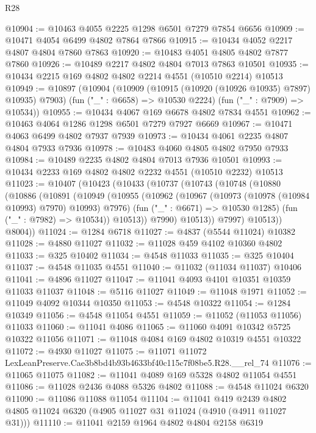 \begin{lexlean}{R28}
\begin{coremodule}
@10904 := @10463 @4055 @2225 @1298 @6501 @7279 @7854 @6656
@10909 := @10471 @4054 @6499 @4802 @7864 @7866
@10915 := @10434 @4052 @2217 @4807 @4804 @7860 @7863
@10920 := @10483 @4051 @4805 @4802 @7877 @7860
@10926 := @10489 @2217 @4802 @4804 @7013 @7863 @10501
@10935 := @10434 @2215 @169 @4802 @4802 @2214 @4551 (@10510 @2214) @10513
@10949 := @10897
    (@10904
      (@10909 (@10915 (@10920 (@10926 @10935) @7897) @10935) @7903)
      (fun ("_" : @6658) => @10530 @2224)
      (fun ("_" : @7909) => @10534))
@10955 := @10434 @4067 @169 @6678 @4802 @7834 @4551
@10962 := @10463 @4064 @1286 @1298 @6501 @7279 @7927 @6669
@10967 := @10471 @4063 @6499 @4802 @7937 @7939
@10973 := @10434 @4061 @2235 @4807 @4804 @7933 @7936
@10978 := @10483 @4060 @4805 @4802 @7950 @7933
@10984 := @10489 @2235 @4802 @4804 @7013 @7936 @10501
@10993 := @10434 @2233 @169 @4802 @4802 @2232 @4551 (@10510 @2232) @10513
@11023 := @10407
    (@10423
      (@10433
        (@10737
          (@10743
            (@10748
              (@10880
                (@10886
                  (@10891
                    (@10949
                      (@10955
                        (@10962
                          (@10967 (@10973 (@10978 (@10984 @10993) @7970) @10993) @7976)
                          (fun ("_" : @6671) => @10530 @1285)
                          (fun ("_" : @7982) => @10534))
                        @10513))
                    @7990)
                  @10513))
              @7997)
            @10513))
        @8004))
@11024 := @1284 @6718
@11027 := @4837 (@5544 @11024) @10382
@11028 := @4880 @11027
@11032 := @11028 @459 @4102 @10360 @4802
@11033 := @325 @10402
@11034 := @4548 @11033
@11035 := @325 @10404
@11037 := @4548 @11035 @4551
@11040 := @11032 (@11034 @11037) @10406
@11041 := @4896 @11027
@11047 := @11041 @4093 @4101 @10351 @10359 @11033 @11037
@11048 := @5116 @11027
@11049 := @11048 @1971
@11052 := @11049 @4092 @10344 @10350
@11053 := @4548 @10322
@11054 := @1284 @10349
@11056 := @4548 @11054 @4551
@11059 := @11052 (@11053 @11056) @11033
@11060 := @11041 @4086
@11065 := @11060 @4091 @10342 @5725 @10322 @11056
@11071 := @11048 @4084 @169 @4802 @10319 @4551 @10322
@11072 := @4930 @11027
@11075 := @11071 @11072 LexLeanPreserve.Cae3b8bd4b93b4633bf40c115c7f08be5.R28.__rel_74
@11076 := @11065 @11075
@11082 := @11041 @4089 @169 @5328 @4802 @11054 @4551
@11086 := @11028 @2436 @4088 @5326 @4802
@11088 := @4548 @11024 @6320
@11090 := @11086 @11088 @11054
@11104 := @11041
    @419
    @2439
    @4802
    @4805
    @11024
    @6320
    (@4905 @11027 @31 @11024 (@4910 (@4911 @11027 @31)))
@11110 := @11041 @2159 @1964 @4802 @4804 @2158 @6319

\end{coremodule}
\end{lexlean}
